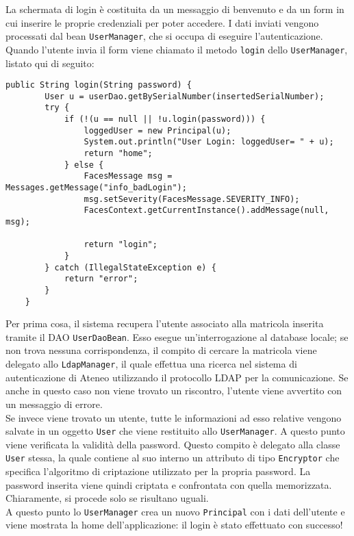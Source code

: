 

La schermata di login è costituita da un messaggio di benvenuto e da un form in cui inserire le proprie credenziali per poter accedere. I dati inviati vengono processati dal bean \lstinline{UserManager}, che si occupa di eseguire l'autenticazione.\\
Quando l'utente invia il form viene chiamato il metodo \lstinline{login} dello \lstinline{UserManager}, listato qui di seguito:

\begin{lstlisting}
public String login(String password) {
		User u = userDao.getBySerialNumber(insertedSerialNumber);
		try {
			if (!(u == null || !u.login(password))) {
				loggedUser = new Principal(u);
				System.out.println("User Login: loggedUser= " + u);
				return "home";
			} else {
				FacesMessage msg = Messages.getMessage("info_badLogin");
				msg.setSeverity(FacesMessage.SEVERITY_INFO);
				FacesContext.getCurrentInstance().addMessage(null, msg);
				
				return "login";
			}
		} catch (IllegalStateException e) {
			return "error";
		}
	}
\end{lstlisting}

Per prima cosa, il sistema recupera l'utente associato alla matricola inserita tramite il DAO \lstinline{UserDaoBean}. Esso esegue un'interrogazione al database locale; se non trova nessuna corrispondenza, il compito di cercare la matricola viene delegato  allo \lstinline{LdapManager}, il quale effettua una ricerca nel sistema di autenticazione di Ateneo utilizzando il protocollo LDAP per la comunicazione. Se anche in questo caso non viene trovato un riscontro, l'utente viene avvertito con un messaggio di errore.\\
Se invece viene trovato un utente, tutte le informazioni ad esso relative vengono salvate in un oggetto \lstinline{User} che viene restituito allo \lstinline{UserManager}. A questo punto viene verificata la validità della password. Questo compito è delegato alla classe \lstinline{User} stessa, la quale contiene al suo interno un attributo di tipo \lstinline{Encryptor} che specifica l'algoritmo di criptazione utilizzato per la propria password. La password inserita viene quindi criptata e confrontata con quella memorizzata. Chiaramente, si procede solo se risultano uguali.\\
A questo punto lo \lstinline{UserManager} crea un nuovo \lstinline{Principal} con i dati dell'utente e viene mostrata la home dell'applicazione: il login è stato effettuato con successo!